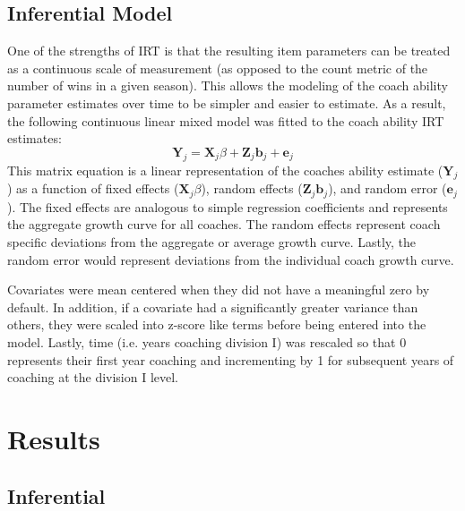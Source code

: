 \documentclass[letterpaper,12pt]{article}
\begin{document}
\subsection{Inferential Model}
One of the strengths of IRT is that the resulting item parameters can be treated as a continuous scale of measurement (as opposed to the count metric of the number of wins in a given season). This allows the modeling of the coach ability parameter estimates over time to be simpler and easier to estimate. As a result, the following continuous linear mixed model was fitted to the coach ability IRT estimates:
\begin{equation}
\textbf{Y}_{j} = \textbf{X}_{j} \beta + \textbf{Z}_{j} \textbf{b}_{j} + \textbf{e}_{j}
\end{equation}
This matrix equation is a linear representation of the coaches ability estimate ($\textbf{Y}_{j}$) as a function of fixed effects ($\textbf{X}_{j} \beta$), random effects ($\textbf{Z}_{j} \textbf{b}_{j}$), and random error ($\textbf{e}_{j}$). The fixed effects are analogous to simple regression coefficients and represents the aggregate growth curve for all coaches. The random effects represent coach specific deviations from the aggregate or average growth curve. Lastly, the random error would represent deviations from the individual coach growth curve. 

Covariates were mean centered when they did not have a meaningful zero by default. In addition, if a covariate had a significantly greater variance than others, they were scaled into z-score like terms before being entered into the model. Lastly, time (i.e. years coaching division I) was rescaled so that 0 represents their first year coaching and incrementing by 1 for subsequent years of coaching at the division I level.

\section{Results}

\subsection{Inferential}
\end{document}
